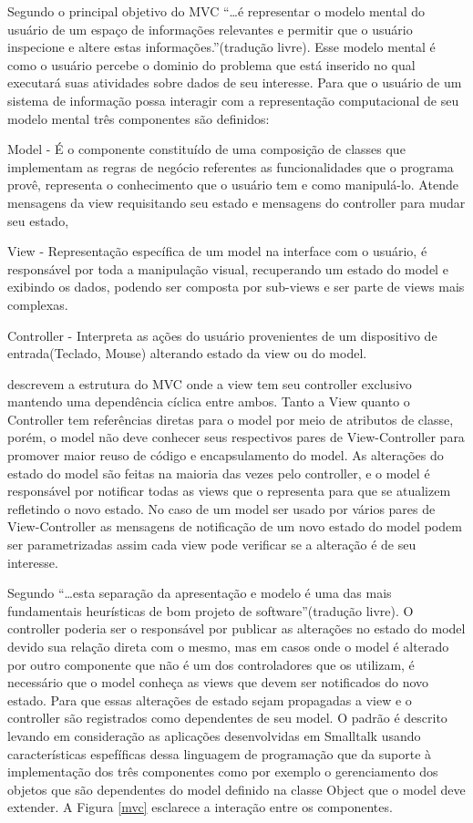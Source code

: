 Segundo  o principal objetivo do MVC
``\ldots é representar o modelo mental do usuário de um espaço de informações
relevantes e permitir que o usuário inspecione e altere estas
informações.''(tradução livre).
Esse modelo mental é como o usuário percebe o dominio do problema que está inserido no qual executará suas atividades sobre dados de seu interesse. Para que o usuário de um sistema de
informação possa interagir com a representação computacional  de seu modelo
mental três componentes são definidos:

Model - É o componente constituído de uma composição de classes que implementam
as regras de negócio referentes as funcionalidades que o programa provê,
representa o  conhecimento que o usuário tem e como manipulá-lo. Atende
mensagens da view requisitando seu estado e mensagens do controller para mudar
seu estado,

View - Representação específica de um model na interface com o usuário, é 
responsável por toda a manipulação visual, recuperando um estado do model e
exibindo os dados, podendo ser composta por sub-views e ser parte de views mais
complexas.

Controller - Interpreta as ações do usuário provenientes de um dispositivo de
entrada(Teclado, Mouse) alterando estado da view ou do model.




 descrevem a estrutura do MVC onde a view tem seu
controller exclusivo mantendo uma dependência cíclica entre ambos. Tanto a View
quanto o Controller tem referências diretas para o model por meio de atributos
de classe, porém, o model não deve conhecer seus respectivos pares de
View-Controller para promover maior reuso de código e encapsulamento do model.
As alterações do estado do model são feitas na maioria das vezes pelo controller, e
o model é responsável por notificar todas as views que o representa para que
se atualizem refletindo o novo estado. No caso de um model ser usado por vários
pares de View-Controller as mensagens de notificação de um novo estado do model
podem ser parametrizadas assim cada view pode verificar se a alteração é de seu
interesse. 

Segundo  ``\ldots esta separação da
apresentação e modelo é uma das mais fundamentais heurísticas de bom projeto
de software''(tradução livre).
O controller poderia ser o responsável por publicar as alterações no estado do
model devido sua relação direta com o mesmo, mas em casos onde o model é
alterado por outro componente que não é um dos controladores que os utilizam, é
necessário que o model conheça as views que devem ser notificados do novo
estado. Para que essas alterações de estado sejam propagadas a view e o
controller são registrados como dependentes de seu model. O padrão é descrito
levando em consideração as aplicações desenvolvidas em Smalltalk usando
características espefíficas dessa linguagem de programação que da suporte à
implementação dos três componentes como por exemplo o gerenciamento dos objetos
que são dependentes do model definido na classe Object que o model deve
extender. A Figura \ref{mvc} esclarece a interação entre os componentes.

